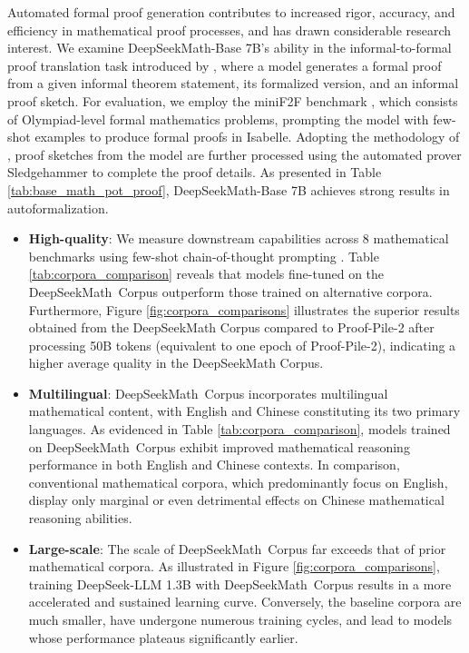 {Automated formal proof generation contributes to increased rigor, accuracy, and efficiency in mathematical proof processes, and has drawn considerable research interest. We examine DeepSeekMath-Base 7B’s ability in the informal-to-formal proof translation task introduced by \citep{dsp_proof}, where a model generates a formal proof from a given informal theorem statement, its formalized version, and an informal proof sketch. For evaluation, we employ the miniF2F benchmark \citep{minif2f}, which consists of Olympiad-level formal mathematics problems, prompting the model with few-shot examples to produce formal proofs in Isabelle. Adopting the methodology of \cite{dsp_proof}, proof sketches from the model are further processed using the automated prover Sledgehammer \citep{sledgehammer} to complete the proof details. As presented in Table \ref{tab:base_math_pot_proof}, DeepSeekMath-Base 7B achieves strong results in autoformalization.

\begin{itemize}[topsep=0pt]
    \item \textbf{High-quality}:
    We measure downstream capabilities across 8 mathematical benchmarks using few-shot chain-of-thought prompting \cite{cot}. Table \ref{tab:corpora_comparison} reveals that models fine-tuned on the DeepSeekMath~Corpus outperform those trained on alternative corpora. Furthermore, Figure \ref{fig:corpora_comparisons} illustrates the superior results obtained from the DeepSeekMath Corpus compared to Proof-Pile-2 after processing 50B tokens (equivalent to one epoch of Proof-Pile-2), indicating a higher average quality in the DeepSeekMath Corpus. 
    \item \textbf{Multilingual}:
    DeepSeekMath~Corpus incorporates multilingual mathematical content, with English and Chinese constituting its two primary languages. As evidenced in Table \ref{tab:corpora_comparison}, models trained on DeepSeekMath~Corpus exhibit improved mathematical reasoning performance in both English and Chinese contexts. In comparison, conventional mathematical corpora, which predominantly focus on English, display only marginal or even detrimental effects on Chinese mathematical reasoning abilities.
    \item \textbf{Large-scale}:
    The scale of DeepSeekMath~Corpus far exceeds that of prior mathematical corpora. As illustrated in Figure \ref{fig:corpora_comparisons}, training DeepSeek-LLM 1.3B with DeepSeekMath~Corpus results in a more accelerated and sustained learning curve. Conversely, the baseline corpora are much smaller, have undergone numerous training cycles, and lead to models whose performance plateaus significantly earlier.
\end{itemize}

}
